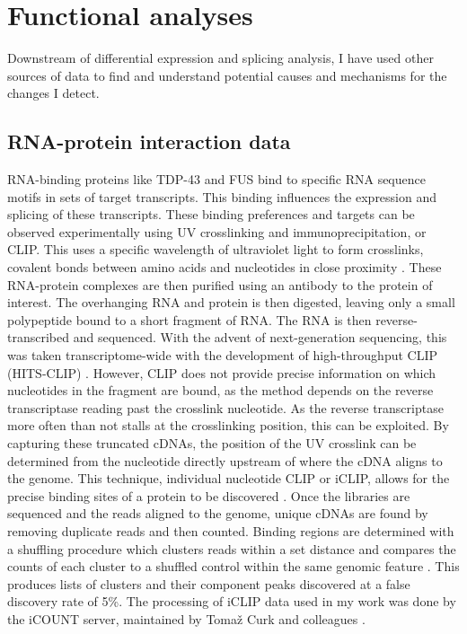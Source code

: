 \section{Functional analyses}

Downstream of differential expression and splicing analysis, I have used other sources of data to find and understand potential causes and mechanisms for the changes I detect.

\subsection{RNA-protein interaction data}

RNA-binding proteins like TDP-43 and FUS bind to specific RNA sequence motifs in sets of target transcripts.
This binding influences the expression and splicing of these transcripts.
These binding preferences and targets can be observed experimentally using UV crosslinking and immunoprecipitation, or CLIP. 
This uses a specific wavelength of ultraviolet light to form crosslinks, covalent bonds between amino acids and nucleotides in close proximity \citep{Ule2003}. 
These RNA-protein complexes are then purified using an antibody to the protein of interest.
The overhanging RNA and protein is then digested, leaving only a small polypeptide bound to a short fragment of RNA.
The RNA is then reverse-transcribed and sequenced.
With the advent of next-generation sequencing, this was taken transcriptome-wide with the development of high-throughput CLIP (HITS-CLIP) \citep{Licatalosi2008}.
However, CLIP does not provide precise information on which nucleotides in the fragment are bound, as the method depends on the reverse transcriptase reading past the crosslink nucleotide.
As the reverse transcriptase more often than not stalls at the crosslinking position, this can be exploited.
By capturing these truncated cDNAs, the position of the UV crosslink can be determined from the nucleotide directly upstream of where the cDNA aligns to the genome.
This technique, individual nucleotide CLIP or iCLIP, allows for the precise binding sites of a protein to be discovered \citep{Konig2010,Huppertz2014-ip}.
Once the libraries are sequenced and the reads aligned to the genome, unique cDNAs are found by removing duplicate reads and then counted. 
Binding regions are determined with a shuffling procedure which clusters reads within a set distance and compares the counts of each cluster to a shuffled control within the same genomic feature \citep{Wang2010}.
This produces lists of clusters and their component peaks discovered at a false discovery rate of 5\%.
The processing of iCLIP data used in my work was done by the iCOUNT server, maintained by Toma{\v{z}} Curk and colleagues \citep{Curk2016}.

